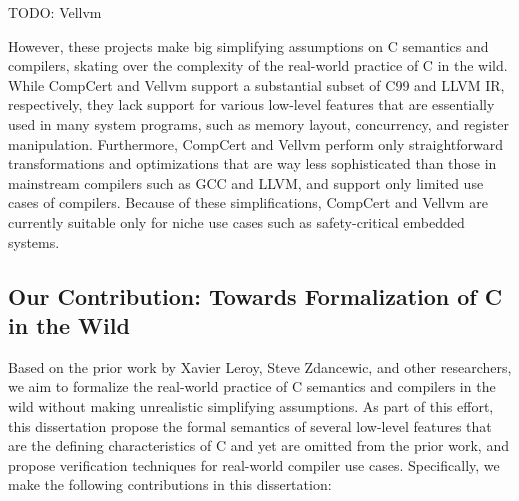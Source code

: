 TODO: Vellvm

However, these projects make big simplifying assumptions on C semantics and compilers, skating over
the complexity of the real-world practice of C in the wild.  While CompCert and Vellvm support a
substantial subset of C99 and LLVM IR, respectively, they lack support for various low-level
features that are essentially used in many system programs, such as memory layout, concurrency, and
register manipulation.  Furthermore, CompCert and Vellvm perform only straightforward
transformations and optimizations that are way less sophisticated than those in mainstream compilers
such as GCC and LLVM, and support only limited use cases of compilers.  Because of these
simplifications, CompCert and Vellvm are currently suitable only for niche use cases such as
safety-critical embedded systems.


\subsection{Our Contribution: Towards Formalization of C in the Wild}

Based on the prior work by Xavier Leroy, Steve Zdancewic, and other researchers, we aim to formalize
the real-world practice of C semantics and compilers in the wild without making unrealistic
simplifying assumptions.  As part of this effort, this dissertation propose the formal semantics of
several low-level features that are the defining characteristics of C and yet are omitted from the
prior work, and propose verification techniques for real-world compiler use cases.  Specifically, we
make the following contributions in this dissertation:

